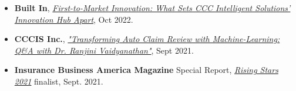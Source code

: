 \begin{itemize}
    \item
    \textbf{Built In}, \href{https://builtin.com/brand-studio/ccc-intelligent-solutions-innovation-hub}{\textit{First-to-Market Innovation: What Sets CCC Intelligent Solutions’ Innovation Hub Apart}}, Oct 2022. 
    \item
    \textbf{CCCIS Inc.}, \href{https://cccis.com/news-and-insights/insurance-carriers/transforming-auto-claim-review-with-machine-learning-qa-with-dr-ranjini-vaidyanathan/}{\textit{"Transforming Auto Claim Review with Machine-Learning: Q\&A with Dr. Ranjini Vaidyanathan"}}, Sept 2021. 
    \item
    \textbf{Insurance Business America Magazine} Special Report, \href{https://issuu.com/keymedia/docs/iba9.10}{\textit{Rising Stars 2021}} finalist, Sept. 2021. 
\end{itemize}